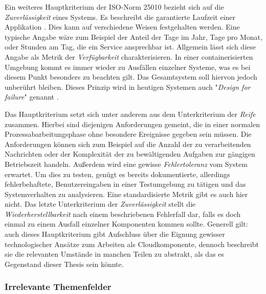 Ein weiteres Hauptkriterium der ISO-Norm 25010 bezieht sich auf die \emph{Zuverlässigkeit} eines Systems. Es beschreibt die garantierte Laufzeit einer Applikation \cite{nfr-dotnetcurry}. Dies kann auf verschiedene Weisen festgehalten werden. Eine typische Angabe wäre zum Beispiel der Anteil der Tage im Jahr, Tage pro Monat, oder Stunden am Tag, die ein Service ansprechbar ist. Allgemein lässt sich diese Angabe als Metrik der \emph{Verfügbarkeit} charakterisieren. In einer containerisierten Umgebung kommt es immer wieder zu Ausfällen einzelner Systeme, was es bei diesem Punkt besonders zu beachten gilt. Das Gesamtsystem soll hiervon jedoch unberührt bleiben. Dieses Prinzip wird in heutigen Systemen auch "\emph{Design for failure}" genannt \cite[Seite~267]{continuous-delivery}. 

Das Hauptkriterium setzt sich unter anderem aus dem Unterkriterium der \emph{Reife} zusammen. Hierbei sind diejenigen Anforderungen gemeint, die in einer normalen Prozessabarbeitungsphase ohne besondere Ereignisse gegeben sein müssen. Die Anforderungen können sich zum Beispiel auf die Anzahl der zu verarbeitenden Nachrichten oder der Komplexität der zu bewältigenden Aufgaben zur gängigen Betriebszeit handeln. Außerdem wird eine gewisse \emph{Fehlertoleranz} vom System erwartet. Um dies zu testen, genügt es bereits dokumentierte, allerdings fehlerbehaftete, Benutzereingaben in einer Testumgebung zu tätigen und das Systemverhalten zu analysieren. Eine standardisierte Metrik gibt es auch hier nicht. Das letzte Unterkriterium der \emph{Zuverlässigkeit} stellt die \emph{Wiederherstellbarkeit} nach einem beschriebenen Fehlerfall dar, falls es doch einmal zu einem Ausfall einzelner Komponenten kommen sollte. Generell gilt: auch dieses Hauptkriterium gibt Aufschluss über die Eignung gewisser technologischer Ansätze zum Arbeiten als Cloudkomponente, dennoch beschreibt sie die relevanten Umstände in manchen Teilen zu abstrakt, als das es Gegenstand dieser Thesis sein könnte.

\subsubsection{Irrelevante Themenfelder}


